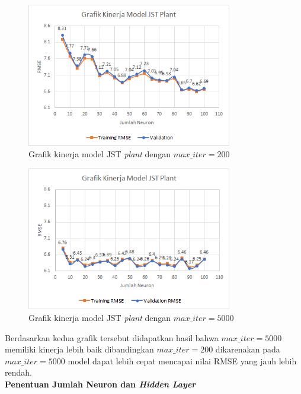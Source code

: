 \begin{figure}[h]
	\centering
	\includegraphics[width=0.8\textwidth]{figures/maxiter200}
	\caption{Grafik kinerja model JST \textit{plant} dengan $max\_iter = 200$}
	\label{fig:5:MaxIter200}
\end{figure}

\begin{figure}[!h]
	\centering
	\includegraphics[width=0.8\textwidth]{figures/maxiter5000}
	\caption{Grafik kinerja model JST \textit{plant} dengan $max\_iter = 5000$}
	\label{fig:5:MaxIter5000}
\end{figure}

Berdasarkan kedua grafik tersebut didapatkan hasil bahwa $max\_iter = 5000$ memiliki kinerja lebih baik dibandingkan $max\_iter = 200$ dikarenakan pada $max\_iter = 5000$ model dapat lebih cepat mencapai nilai RMSE yang jauh lebih rendah. \\

\noindent \textbf{Penentuan Jumlah Neuron dan \textit{Hidden Layer}}

